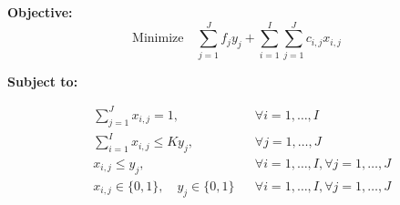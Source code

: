 \documentclass{article}
\begin{document}
\textbf{Objective:}
\[
\text{Minimize} \quad \sum_{j=1}^{J} f_j y_j + \sum_{i=1}^{I} \sum_{j=1}^{J} c_{i,j} x_{i,j}
\]

\textbf{Subject to:}

\begin{align}
& \sum_{j=1}^{J} x_{i,j} = 1, && \forall i = 1, \ldots, I \\
& \sum_{i=1}^{I} x_{i,j} \leq K y_j, && \forall j = 1, \ldots, J \\
& x_{i,j} \leq y_j, && \forall i = 1, \ldots, I, \forall j = 1, \ldots, J \\
& x_{i,j} \in \{0, 1\}, \quad y_j \in \{0, 1\} && \forall i = 1, \ldots, I, \forall j = 1, \ldots, J
\end{align}
\end{document}
